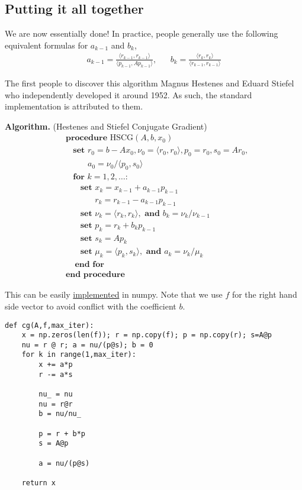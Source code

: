 \hypertarget{putting-it-all-together}{%
\subsection{Putting it all together}\label{putting-it-all-together}}

We are now essentially done! In practice, people generally use the
following equivalent formulas for \(a_{k-1}\) and \(b_k\),
\begin{align*}
a_{k-1} = \frac{\langle r_{k-1},r_{k-1}\rangle}{\langle p_{k-1},Ap_{k-1}\rangle}
,&&
b_k = \frac{\langle r_k,r_k\rangle}{\langle r_{k-1},r_{k-1}\rangle}
\end{align*}

The first people to discover this algorithm Magnus Hestenes and Eduard
Stiefel who independently developed it around 1952. As such, the
standard implementation is attributed to them.

\textbf{Algorithm.} (Hestenes and Stiefel Conjugate Gradient)
\begin{align*}
&\textbf{procedure}\text{ HSCG}( A,b,x_0 ) 
\\[-.4em]&~~~~\textbf{set } r_0 = b-Ax_0, \nu_0 = \langle r_0,r_0 \rangle, p_0 = r_0, s_0 = Ar_0, 
\\[-.4em]&~~~~\phantom{\textbf{set }}a_0 = \nu_0 / \langle p_0,s_0 \rangle
\\[-.4em]&~~~~\textbf{for } k=1,2,\ldots \textbf{:} 
\\[-.4em]&~~~~~~~~\textbf{set } x_k = x_{k-1} + a_{k-1} p_{k-1} 
\\[-.4em]&~~~~~~~~\phantom{\textbf{set }} r_k = r_{k-1} - a_{k-1} p_{k-1} 
\\[-.4em]&~~~~~~~~\textbf{set } \nu_{k} = \langle r_k,r_k \rangle, \textbf{ and } b_k = \nu_k / \nu_{k-1}
\\[-.4em]&~~~~~~~~\textbf{set }p_k = r_k + b_k p_{k-1}
\\[-.4em]&~~~~~~~~\textbf{set }s_k = A p_k
\\[-.4em]&~~~~~~~~\textbf{set }\mu_k = \langle p_k,s_k \rangle, \textbf{ and } a_k = \nu_k / \mu_k
\\[-.4em]&~~~~~\textbf{end for}
\\[-.4em]&\textbf{end procedure}
\end{align*}

This can be easily \href{./cg.py}{implemented} in numpy. Note that we
use \(f\) for the right hand side vector to avoid conflict with the
coefficient \(b\).

\begin{verbatim}
def cg(A,f,max_iter):
    x = np.zeros(len(f)); r = np.copy(f); p = np.copy(r); s=A@p
    nu = r @ r; a = nu/(p@s); b = 0
    for k in range(1,max_iter):
        x += a*p
        r -= a*s

        nu_ = nu
        nu = r@r
        b = nu/nu_

        p = r + b*p
        s = A@p

        a = nu/(p@s)

    return x
\end{verbatim}

